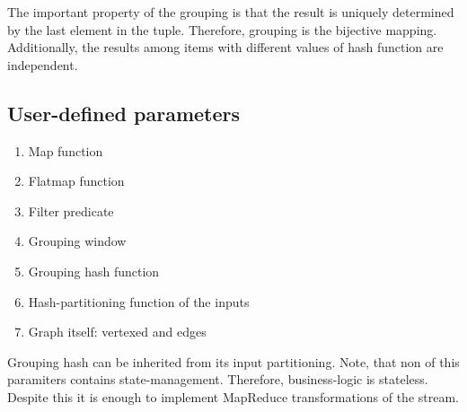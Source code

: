 The important property of the grouping is that the result is uniquely determined by the last element in the tuple. Therefore, grouping is the bijective mapping. Additionally, the results among items with different values of hash function are independent.

\subsection{User-defined parameters}

\begin{enumerate}
  \item{Map function}
  \item{Flatmap function}
  \item{Filter predicate}
  \item{Grouping window}
  \item{Grouping hash function}
  \item{Hash-partitioning function of the inputs}
  \item{Graph itself: vertexed and edges}
\end{enumerate}

Grouping hash can be inherited from its input partitioning. Note, that non of this paramiters contains state-management. Therefore, business-logic is stateless. Despite this it is enough to implement MapReduce transformations of the stream.
